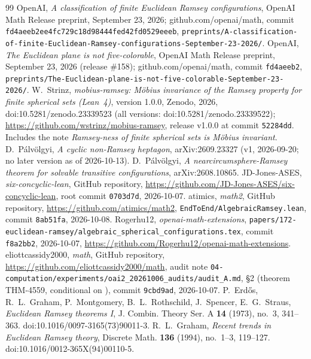 \documentclass[11pt]{amsart}
\theoremstyle{plain}
\theoremstyle{definition}
\begin{document}
\begin{thebibliography}{99}
 OpenAI, \emph{A classification of finite Euclidean Ramsey configurations},
OpenAI Math Release preprint, September 23, 2026; github.com/openai/math, commit
\texttt{fd4aeeb2ee4fc729c18d98444fed42fd0529eeeb},
\texttt{preprints/A-classification-of-finite-Euclidean-Ramsey-configurations-September-23-2026/}.
 OpenAI, \emph{The Euclidean plane is not five-colorable}, OpenAI Math Release preprint, September 23,
2026 (release \#158); github.com/openai/math, commit \texttt{fd4aeeb2},
\texttt{preprints/The-Euclidean-plane-is-not-five-colorable-September-23-2026/}.
 W.~Strinz, \emph{mobius-ramsey: M\"obius invariance of the Ramsey property for finite
spherical sets (Lean~4)}, version 1.0.0, Zenodo, 2026, doi:10.5281/zenodo.23339523 (all versions:
doi:10.5281/zenodo.23339522); \url{https://github.com/wstrinz/mobius-ramsey}, release v1.0.0 at commit
\texttt{52284dd}. Includes the note \emph{Ramsey-ness of finite spherical sets is M\"obius invariant}.
 D.~P\'alv\"olgyi, \emph{A cyclic non-Ramsey heptagon}, arXiv:2609.23327 (v1,
2026-09-20; no later version as of 2026-10-13).
 D.~P\'alv\"olgyi, \emph{A nearcircumsphere-Ramsey theorem for solvable transitive
configurations}, arXiv:2608.10865.
 JD-Jones-ASES, \emph{six-concyclic-lean}, GitHub repository,
\url{https://github.com/JD-Jones-ASES/six-concyclic-lean}, root commit \texttt{0703d7d}, 2026-10-07.
 atimics, \emph{math2}, GitHub repository, \url{https://github.com/atimics/math2},
\texttt{EndToEnd/AlgebraicRamsey.lean}, commit \texttt{8ab51fa}, 2026-10-08.
 Rogerhu12, \emph{openai-math-extensions},
\texttt{papers/172-euclidean-ramsey/algebraic\_spherical\_configurations.tex}, commit \texttt{f8a2bb2},
2026-10-07, \url{https://github.com/Rogerhu12/openai-math-extensions}.
 eliottcassidy2000, \emph{math}, GitHub repository, \url{https://github.com/eliottcassidy2000/math},
audit note \texttt{04-computation/experiments/oai2\_20261006\_audits/audit\_A.md}, \S2 (theorem
THM-4559, conditional on \cite{OAI172}), commit \texttt{9cbd9ad}, 2026-10-07.
 P.~Erd\H{o}s, R.~L.~Graham, P.~Montgomery, B.~L.~Rothschild, J.~Spencer, E.~G.~Straus,
\emph{Euclidean Ramsey theorems I}, J. Combin. Theory Ser. A \textbf{14} (1973), no.~3, 341--363.
doi:10.1016/0097-3165(73)90011-3.
 R.~L.~Graham, \emph{Recent trends in Euclidean Ramsey theory}, Discrete Math. \textbf{136}
(1994), no.~1--3, 119--127. doi:10.1016/0012-365X(94)00110-5.

\end{thebibliography}
\end{document}

